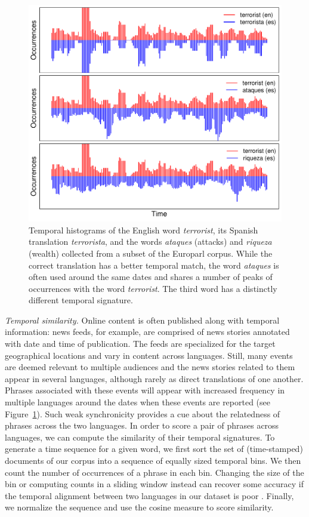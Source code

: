 \documentclass[11pt]{article}
\newcommand{\figref}[1]{Figure~\ref{#1}}
\begin{document}
\begin{figure}[t]
\includegraphics[width= \linewidth]{../figures/temporal/temporal}
\caption{Temporal histograms of the English word {\em terrorist}, its Spanish translation {\em terrorista}, and the words {\em ataques}  (attacks) and {\em riqueza} (wealth) collected from a subset of the Europarl corpus. While the correct translation has a better temporal match, the word {\em ataques} is often used around the same dates and shares a number of peaks of occurrences with the word {\em terrorist}.  The third word has a distinctly different temporal signature.}
\label{fig:temporal}
\end{figure}

\noindent\emph{Temporal similarity.} Online content is often published along with temporal information: news feeds, for example, are comprised of news stories annotated with date and time of publication.  The feeds are specialized for the target geographical locations and vary in content across languages.  Still, many events are deemed relevant to multiple audiences and the news stories related to them appear in several languages, although rarely as direct translations of one another.  Phrases associated with these events will appear with increased frequency in multiple languages around the dates when these events are reported (see \figref{fig:temporal}).  Such weak synchronicity provides a cue about the relatedness of phrases across the two languages.  In order to score a pair of phrases across languages, we can compute the similarity of their temporal signatures. To generate a time sequence for a given word, we first sort the set of (time-stamped) documents of our corpus into a sequence of equally sized temporal bins.  We then count the number of occurrences of a phrase in each bin.  Changing the size of the bin or computing counts in a sliding window instead can recover some accuracy if the temporal alignment between two languages in our dataset is poor \cite{Klementiev:2006b}.  Finally, we normalize the sequence and use the cosine measure to score similarity. 
\end{document}
